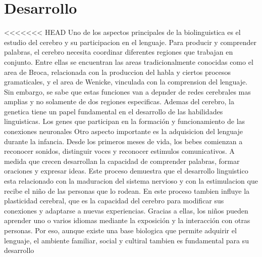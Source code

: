 \documentclass[12pt]{article}
\begin{document}
\section{Desarrollo}
<<<<<<< HEAD
Uno de los aspectos principales de la biolinguistica es el estudio del cerebro y su participacion en el lenguaje. Para producir y comprender palabras, el cerebro necesita coordinar diferentes regiones que trabajan en conjunto. Entre ellas se encuentran las areas tradicionalmente conocidas como el area de Broca, relacionada con la produccion del habla y ciertos procesos gramaticales, y el area de Wenicke, vinculada con la comprension del lenguaje. Sin embargo, se sabe que estas funciones van a depnder de redes cerebrales mas amplias y no solamente de dos regiones especificas.
Ademas del cerebro, la genetica tiene un papel fundamental en el desarrollo de las habilidades linguisticas. Los genes que participan en la formación y funcionamiento de las conexiones neuronales
Otro aspecto importante es la adquisicion del lenguaje durante la infancia. Desde los primeros meses de vida, los bebes comienzan a reconocer sonidos, distinguir voces y reconocer estimulos comunicativos. A medida que crecen desarrollan la capacidad de comprender palabras, formar oraciones y expresar ideas. Este proceso demuestra que el desarrollo linguistico esta relacionado con la maduracion del sistema nervioso  y con la estimulacion que recibe el niño de las personas que lo rodean.
En este proceso tambien influye la plasticidad cerebral, que es la capacidad del cerebro para modificar sus conexiones y adaptarse a nuevas experiencias. Gracias a ellas, los niños pueden aprender uno o varios idiomas mediante la exposición y la interacción con otras personas. Por eso, aunque existe una base biologica que permite adquirir el lenguaje, el ambiente familiar, social y cultiral tambien es fundamental para su desarrollo
\end{document}
